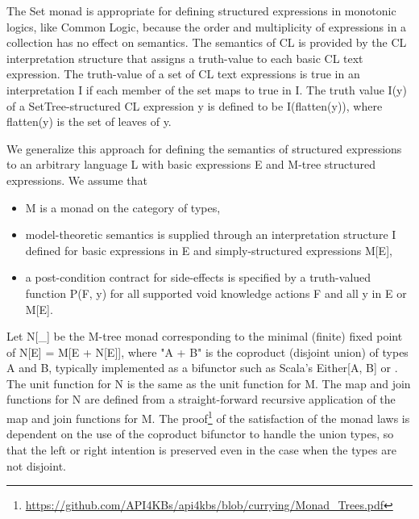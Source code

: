 \documentclass[runningheads]{llncs}
\begin{document}
The Set monad is appropriate for defining structured expressions in monotonic logics, like Common Logic, because the order and multiplicity of expressions in a collection has no effect on semantics. The semantics of CL is provided by the CL interpretation structure that assigns a truth-value to each basic CL text expression. The truth-value of a set of CL text expressions is true in an interpretation I if each member of the set maps to true in I. The truth value I(y) of a SetTree-structured CL expression y is defined to be I(flatten(y)), where flatten(y) is the set of leaves of y.

We generalize this approach for defining the semantics of structured expressions to an arbitrary language L with basic expressions E and M-tree structured expressions. We assume that 
\begin{itemize}
\item M is a monad on the category of types,
\item model-theoretic semantics is supplied through an interpretation structure I defined for basic expressions in E and simply-structured expressions M[E],
\item a post-condition contract for side-effects is specified by a truth-valued function P(F, y) for all supported void knowledge actions F and all y in E or M[E].
\end{itemize}

Let N[\_] be the M-tree monad corresponding to the minimal (finite) fixed point of N[E] = M[E + N[E]], where "A + B" is the coproduct (disjoint union) of types A and B, typically implemented as a bifunctor such as Scala's Either[A, B] or .
The unit function for N is the same as the unit function for M.
The map and join functions for N are defined from a straight-forward recursive application of the map and join functions for M.
The proof\footnote{\url{https://github.com/API4KBs/api4kbs/blob/currying/Monad_Trees.pdf}\label{note:proof}} of the satisfaction of the monad laws is dependent on the use of the coproduct bifunctor to handle the union types, so that the left or right intention is preserved even in the case when the types are not disjoint. 
\end{document}
